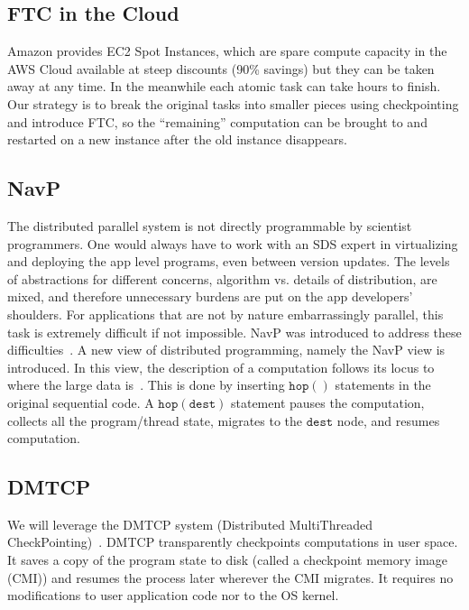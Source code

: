 \documentclass[conference]{IEEEtran}
\begin{document}
\subsection{FTC in the Cloud}
\label{subsec:s11}

Amazon provides EC2 Spot Instances, which are spare compute capacity in the AWS Cloud available at steep discounts (90\% savings) but they can be taken away at any time. In the meanwhile each atomic task can take hours to finish. Our strategy is to break the original tasks into smaller pieces using checkpointing and introduce FTC, so the ``remaining'' computation can be brought to and restarted on a new instance after the old instance disappears.

\subsection{NavP}
\label{subsec:s12}

The distributed parallel system is not directly programmable by scientist programmers. One would always have to work with an SDS expert in virtualizing and deploying the app level programs, even between version updates. The levels of abstractions for different concerns, algorithm vs. details of distribution, are mixed, and therefore unnecessary burdens are put on the app developers’ shoulders. For applications that are not by nature embarrassingly parallel, this task is extremely difficult if not impossible. NavP was introduced to address these difficulties~\cite{pan2004navp}. A new view of distributed programming, namely the NavP view is introduced. In this view, the description of a computation follows its locus to where the large data is~\cite{pan_views_PDCS03}. This is done by inserting  $\mathtt{hop()}$ statements in the original sequential code. A $\mathtt{hop(dest)}$ statement pauses the computation, collects all the program/thread state, migrates to the $\mathtt{dest}$ node, and resumes computation.

\subsection{DMTCP}
\label{subsec:s13}

We will leverage the DMTCP system (Distributed MultiThreaded CheckPointing)~\cite{ansel2009dmtcp}. DMTCP transparently checkpoints computations in user space. It saves a copy of the program state to disk (called a checkpoint memory image (CMI)) and resumes the process later wherever the CMI migrates. It requires no modifications to user application code nor to the OS kernel.
\end{document}
